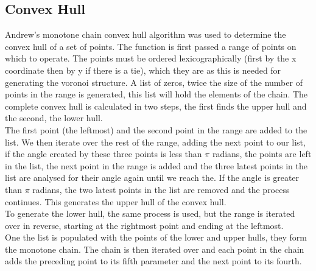 \subsection{Convex Hull}
Andrew's monotone chain convex hull algorithm was used to determine the convex hull of a set of points. The function is first passed a range of points on which to operate. The points must be ordered lexicographically (first by the x coordinate then by y if there is a tie), which they are as this is needed for generating the voronoi structure. A list of zeros, twice the size of the number of points in the range is generated, this list will hold the elements of the chain. The complete convex hull is calculated in two steps, the first finds the upper hull and the second, the lower hull.
\\
The first point (the leftmost) and the second point in the range are added to the list. We then iterate over the rest of the range, adding the next point to our list, if the angle created by these three points is less than $\pi$ radians, the points are left in the list, the next point in the range is added and the three latest points in the list are analysed for their angle again until we reach the. If the angle is greater than $\pi$ radians, the two latest points in the list are removed and the process continues. This generates the upper hull of the convex hull.
\\
To generate the lower hull, the same process is used, but the range is iterated over in reverse, starting at the rightmost point and ending at the leftmost.
\\
One the list is populated with the points of the lower and upper hulls, they form the monotone chain. The chain is then iterated over and each point in the chain adds the preceding point to its fifth parameter and the next point to its fourth.

